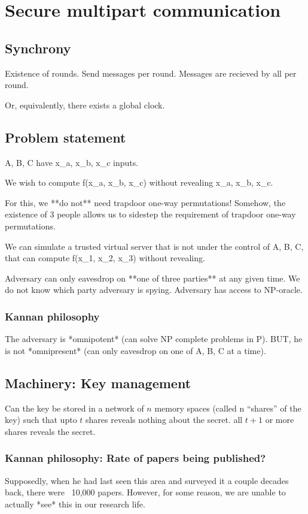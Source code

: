 \section{Secure multipart communication}

\subsection{Synchrony}
Existence of rounds. Send messages per round. Messages are
recieved by all per round.

Or, equivalently, there exists a global clock.

\subsection{Problem statement}

A, B, C have x_a, x_b, x_c inputs.

We wish to compute f(x_a, x_b, x_c) without revealing x_a, x_b, x_c.

For this, we **do not** need trapdoor one-way permutations!
Somehow, the existence of 3 people allows us to sidestep the
requirement of trapdoor one-way permutations.

We can simulate a trusted virtual server that is not under the control of
A, B, C, that can compute f(x_1, x_2, x_3) without revealing.

Adversary can only eavesdrop on **one of three parties** at any given time.
We do not know which party adversary is spying. Adversary has access to NP-oracle.

\subsubsection{Kannan philosophy}
The adversary is *omnipotent* (can solve NP complete problems in P). BUT, he
is not *omnipresent* (can only eavesdrop on one of A, B, C at a time).


\subsection{Machinery: Key management}

Can the key be stored in a network of $n$ memory spaces (called n ``shares'' of the key)
such that upto $t$ shares reveals nothing about the secret. all $t + 1$ or more shares
reveals the secret.

\subsubsection{Kannan philosophy: Rate of papers being published?}
Supposedly, when he had last seen this area and surveyed it a couple decades back, there were ~10,000 papers.
However, for some reason, we are unable to actually *see* this in our research life.

